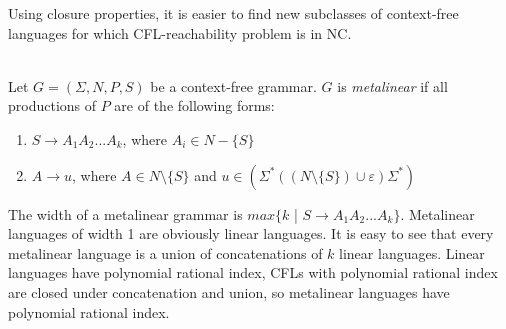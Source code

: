 Using closure properties, it is easier to find new subclasses of context-free languages for which CFL-reachability problem is in NC.
\begin{example}
\\
Let $G = (\Sigma, N, P, S)$ be a context-free grammar. $G$ is \textit{metalinear} if all productions of $P$ are of the following forms:
\begin{enumerate}
\item $S \rightarrow A_1A_2...A_k$, where $A_i \in N - \{S\}$
\item $A \rightarrow u$, where $A \in N \setminus \{S\}$ and $u \in (\Sigma^*((N \setminus \{S\}) \cup {\varepsilon})\Sigma^*)$
\end{enumerate}


The width of a metalinear grammar is $max\{k$ | $S \rightarrow A_1A_2...A_k \}$. Metalinear languages of width 1 are obviously linear languages. It is easy to see that every metalinear language is a union of concatenations of $k$ linear languages. Linear languages have polynomial rational index,  CFLs with polynomial rational index are closed under concatenation and union, so metalinear languages have polynomial rational index.
\end{example}

